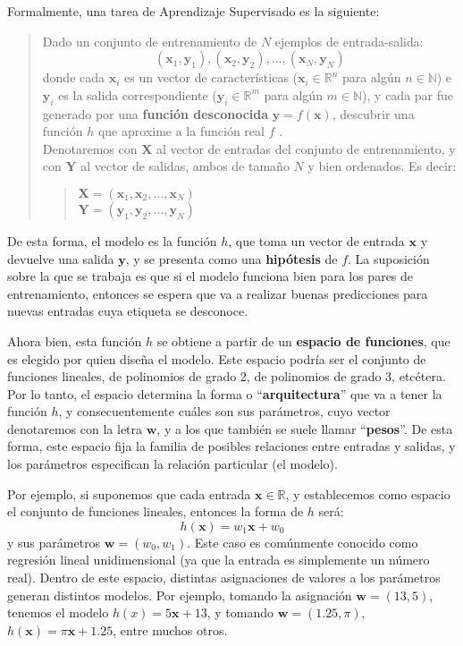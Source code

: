 \documentclass[../../main.tex]{subfiles}
\begin{document}
Formalmente, una tarea de Aprendizaje Supervisado es la siguiente:
\begin{quote}
    Dado un conjunto de entrenamiento de \(N\) ejemplos de entrada-salida:
    \[(\bm{x}_1, \bm{y}_1), (\bm{x}_2, \bm{y}_2), ..., (\bm{x}_N,
    \bm{y}_N)\] donde cada \(\bm{x}_i\) es un vector de características
    (\(\bm{x}_i \in \mathbb{R}^n\) para algún \(n \in \mathbb{N}\)) e \(\bm{y}_i\)
    es la salida correspondiente (\(\bm{y}_i \in \mathbb{R}^m\) para algún \(m \in
    \mathbb{N}\)), y cada par fue generado por una \textbf{función desconocida}
    \(\bm{\bm{y}}=f(\bm{x})\), descubrir una función \(h\) que aproxime a la
    función real \(f\) \cite{ai-a-modern-approach}.\\
    Denotaremos con \(\bm{X}\) al vector de entradas del conjunto de entrenamiento, y
    con \(\bm{Y}\) al vector de salidas, ambos de tamaño \(N\) y bien ordenados. Es
    decir:
    \begin{quote}
        \(\bm{X}=(\bm{x}_1, \bm{x}_2, ..., \bm{x}_N)\)\\
        \(\bm{Y}=(\bm{y}_1, \bm{y}_2, ..., \bm{y}_N)\)
    \end{quote}
\end{quote}
De esta forma, el modelo es la función \(h\), que toma un vector de entrada \(\bm{x}\)
y devuelve una salida \(\bm{y}\), y se presenta como una \textbf{hipótesis} de \(f\).
La suposición sobre la que se trabaja es que si el modelo funciona bien para los pares de
entrenamiento, entonces se espera que va a realizar buenas predicciones para nuevas
entradas cuya etiqueta se desconoce.

Ahora bien, esta función \(h\) se obtiene a partir de un \textbf{espacio de funciones},
que es elegido por quien diseña el modelo. Este espacio podría ser el conjunto de
funciones lineales, de polinomios de grado 2, de polinomios de grado 3, etcétera. Por lo
tanto, el espacio determina la forma o ``\textbf{arquitectura}'' que va a tener la función
\(h\), y consecuentemente cuáles son sus parámetros, cuyo vector denotaremos con la letra
\(\bm{\bm{w}}\), y a los que también se suele llamar ``\textbf{pesos}''. De esta forma,
este espacio fija la familia de posibles relaciones entre entradas y salidas, y los
parámetros especifican la relación particular (el modelo).

Por ejemplo, si suponemos que cada entrada \(\bm{x} \in \mathbb{R}\), y establecemos
como espacio el conjunto de funciones lineales, entonces la forma de \(h\) será:
\[h(\bm{x}) = w_1 \bm{x} + w_0\] y sus parámetros \(\bm{w}=(w_0, w_1)\). Este caso
es comúnmente conocido como regresión lineal unidimensional (ya que la entrada es
simplemente un número real). Dentro de este espacio, distintas asignaciones de valores
a los parámetros generan distintos modelos. Por ejemplo, tomando la asignación
\(\bm{w}=(13, 5)\), tenemos el modelo \(h(x) = 5\bm{x} + 13\), y tomando \(\bm{w}=(1{.}25, \pi)\),
\(h(\bm{x}) = \pi \bm{x} + 1{.}25\), entre muchos otros.
\end{document}
